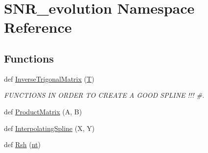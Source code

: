 \hypertarget{namespaceSNR__evolution}{}\section{S\+N\+R\+\_\+evolution Namespace Reference}
\label{namespaceSNR__evolution}
\subsection*{Functions}
\begin{DoxyCompactItemize}
\item 
def \hyperlink{namespaceSNR__evolution_a4eff759f9aa4a1e06b487c1223377390}{Inverse\+Trigonal\+Matrix} (\hyperlink{cr__source_8h_ac94a6e5794c2d7b59588b14025cfba20}{T})
\begin{DoxyCompactList}\small\item\em F\+U\+N\+C\+T\+I\+O\+NS IN O\+R\+D\+ER TO C\+R\+E\+A\+TE A G\+O\+OD S\+P\+L\+I\+NE !!! \#. \end{DoxyCompactList}\item 
def \hyperlink{namespaceSNR__evolution_afc6bde93d3d60f69068e8b403e5e32b5}{Product\+Matrix} (A, B)
\item 
def \hyperlink{namespaceSNR__evolution_a2ce2af757e103b1693310fe9e68806c0}{Interpolating\+Spline} (X, Y)
\item 
def \hyperlink{namespaceSNR__evolution_ad16fd569419cfb44f067ccd99bb08175}{Rsh} (\hyperlink{cr__source_8h_ad39423a7b14094ed17af35a0603f1a33}{nt})
\end{DoxyCompactItemize}
